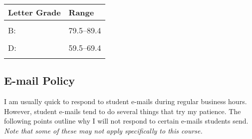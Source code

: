 \documentclass[11pt,]{article}
\begin{document}
\begin{table}
\centering
\begin{tabular}{ll}
\toprule
Letter Grade & Range\\
\midrule
\cellcolor{gray!6}{A:} & \cellcolor{gray!6}{89.5–100}\\
B: & 79.5–89.4\\
\cellcolor{gray!6}{C:} & \cellcolor{gray!6}{69.5–79.4}\\
D: & 59.5–69.4\\
\cellcolor{gray!6}{F:} & \cellcolor{gray!6}{00.0-59.4}\\
\bottomrule
\end{tabular}
\end{table}

\hypertarget{e-mail-policy}{%
\subsection{E-mail Policy}\label{e-mail-policy}}

I am usually quick to respond to student e-mails during regular business
hours. However, student e-mails tend to do several things that try my
patience. The following points outline why I will not respond to certain
e-mails students send. \emph{Note that some of these may not apply
specifically to this course.}
\end{document}
